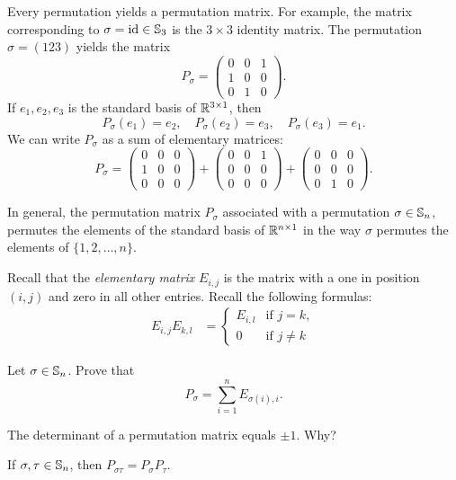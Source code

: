 Every permutation yields a permutation matrix. For example, 
the matrix corresponding to $\sigma=\operatorname{id}\in\mathbb{S}_3$ 
is the $3\times 3$ identity matrix. The permutation
$\sigma=(123)$ yields the matrix 
\[
P_\sigma=\begin{pmatrix}0&0&1\\1&0&0\\0&1&0\end{pmatrix}.
\]
If $e_1,e_2,e_3$ is the standard basis of $\mathbb{R}^{3\times1}$, then
\[
P_{\sigma}(e_1)=e_2,
\quad 
P_{\sigma}(e_2)=e_3,
\quad 
P_{\sigma}(e_3)=e_1.
\]
We can write $P_\sigma$ as a sum
of elementary matrices: 
\[
P_\sigma=\begin{pmatrix}
    0&0&0\\
    1&0&0\\
    0&0&0
\end{pmatrix}
+\begin{pmatrix}
    0&0&1\\
    0&0&0\\
    0&0&0
\end{pmatrix}
+\begin{pmatrix}
    0&0&0\\
    0&0&0\\
    0&1&0
\end{pmatrix}.
\]

In general, the permutation matrix
$P_\sigma$ associated with a permutation 
$\sigma\in\mathbb{S}_n$, permutes the elements of the standard basis
of $\mathbb{R}^{n\times1}$ in the way $\sigma$ permutes 
the elements of $\{1,2,\dots,n\}$.

Recall that the 
\emph{elementary matrix} 
$E_{i,j}$ is the matrix with a one in position
$(i,j)$ and zero in all other entries. Recall the
following formulas: 
\begin{align*}
E_{i,j}E_{k,l}&=\begin{cases}
E_{i,l} & \text{if $j=k$},\\
0 & \text{if $j\ne k$}
\end{cases}
\end{align*}

\begin{exercise}
\label{xca:permutation_matrix}
Let $\sigma\in\mathbb{S}_n$. Prove that
\[
P_\sigma=\sum_{i=1}^n E_{\sigma(i),i}.
\]
\end{exercise}

The determinant of a permutation matrix equals 
$\pm1$. Why? 

\begin{proposition}
If $\sigma,\tau\in\mathbb{S}_n$, then $P_{\sigma\tau}=P_\sigma P_\tau$.
\end{proposition}

